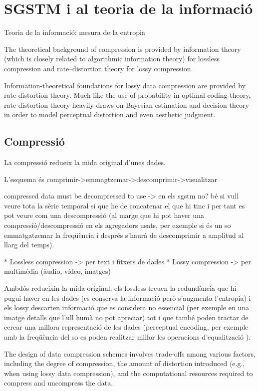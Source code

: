 
\chapter{SGSTM i al teoria de la informació}


Teoria de la informació: mesura de la entropia


The theoretical background of compression is provided by information theory (which is closely related to algorithmic information theory) for lossless compression and rate–distortion theory for lossy compression. 

Information-theoretical foundations for lossy data compression are provided by rate-distortion theory. Much like the use of probability in optimal coding theory, rate-distortion theory heavily draws on Bayesian estimation and decision theory in order to model perceptual distortion and even aesthetic judgment.


\section{Compressió}

La compressió redueix la mida original d'unes dades. 

L'esquema és comprimir->emmagtzemar->descomprimir->visualitzar

compressed data must be decompressed to use -> en els sgstm no? bé si vull veure tota la sèrie temporal sí que he de concatenar el que hi tinc i per tant es pot veure com una descompressió (al marge que hi pot haver una compressió/descompressió en els agregadors usats, per exemple si és un so emmatgatzemar la freqüència i després s'haurà de descomprimir a amplitud al llarg del temps).


* Lossless compression -> per text i fitxers de dades
* Lossy compression -> per multimèdia (àudio, vídeo, imatges)

Ambdós redueixin la mida original, els lossless treuen la redundància que hi pugui haver en les dades (es conserva la informació però s'augmenta l'entropia) i els lossy descarten informació que es considera no essencial (per exemple en una imatge detalls que l'ull humà no pot apreciar) tot i que també poden tractar de cercar una millora representació de les dades (perceptual encoding, per exemple amb la freqüència del so es poden realitzar millor les operacions d'equalització ).

The design of data compression schemes involves trade-offs among various factors, including the degree of compression, the amount of distortion introduced (e.g., when using lossy data compression), and the computational resources required to compress and uncompress the data.

